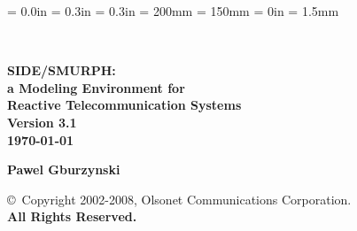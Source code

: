 \newcommand{\references}[1]{%
}%

\newenvironment{doublespace}%
{\renewcommand{\baselinestretch}{1.50} \large \normalsize}%
{\renewcommand{\baselinestretch}{1} \large \normalsize}%

\newenvironment{singlespace}%
{\renewcommand{\baselinestretch}{1} \large \normalsize}%
{\renewcommand{\baselinestretch}{1.50} \large \normalsize}%

\newcommand{\lansf}{{\sc LANSF}}
\newcommand{\smurph}{{\sc SIDE}}
\newcommand{\dsd}{{\sc DSD}}
\newcommand{\smurphtt}{{\tt SIDE}}
\newcommand{\smurphrm}{{SIDE}}
\newcommand{\smurphtts}{{\tt side}}
\newcommand{\serdel}{{\sc SERDEL}}
\newcommand{\djgpp}{{\sc DJGPP}}

\topmargin = 0.0in
\oddsidemargin = 0.3in
\evensidemargin = 0.3in
\textheight = 200mm
\textwidth = 150mm
\parindent = 0in
\parskip = 1.5mm

\sloppy



\begin{titlepage}

\vspace*{0.35in}

\begin{center}

 \\

\vspace*{0.45in}

\Huge\bf SIDE/SMURPH:\vspace{0.1in} \\

\huge\bf a Modeling Environment for\vspace{0.1in} \\

Reactive Telecommunication Systems\vspace{0.25in}\\

\Large Version 3.1 \\

\large {\today} \\

\vspace{1.1in}

\bf Pawel Gburzynski \\

\vspace*{1.5in}

{\Large {\copyright}~Copyright 2002-2008, Olsonet Communications Corporation.\\
{\bf All Rights Reserved.}}

\normalsize

\end{center}

\end{titlepage}

